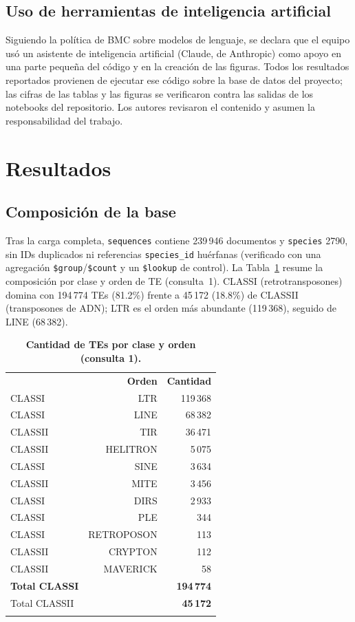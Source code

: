 \documentclass[pdflatex,sn-vancouver-num,lineno,referee]{sn-jnl}
\newcommand\cab[1]{{\color{white}\bfseries #1}}%
\newcommand\filasalternas{\rowcolors{2}{}{teClaro}}%
\begin{document}
\subsection{Uso de herramientas de inteligencia artificial}

Siguiendo la política de BMC sobre modelos de lenguaje, se declara que el
equipo usó un asistente de inteligencia artificial (Claude, de Anthropic)
como apoyo en una parte pequeña del código y en la creación de las figuras.
Todos los resultados reportados provienen de ejecutar ese código sobre la
base de datos del proyecto; las cifras de las tablas y las figuras se
verificaron contra las salidas de los notebooks del repositorio. Los autores
revisaron el contenido y asumen la responsabilidad del trabajo.

\section{Resultados}\label{sec:resultados}

\subsection{Composición de la base}

Tras la carga completa, \texttt{sequences} contiene 239\,946 documentos y
\texttt{species} 2790, sin IDs duplicados ni referencias
\texttt{species\_id} huérfanas (verificado con una agregación
\texttt{\$group}/\texttt{\$count} y un \texttt{\$lookup} de control). La
Tabla~\ref{tab:composicion} resume la composición por clase y orden de TE
(consulta~1). CLASSI (retrotransposones) domina con 194\,774 TEs (81.2\%)
frente a 45\,172 (18.8\%) de CLASSII (transposones de ADN); LTR es el orden
más abundante (119\,368), seguido de LINE (68\,382).

\begin{table}[!ht]
\caption{\textbf{Cantidad de TEs por clase y orden (consulta 1).}}
\filasalternas
\begin{tabular}{@{}lrr@{}}
\rowcolor{teOscuro}\cab{Clase} & \cab{Orden} & \cab{Cantidad} \\
CLASSI  & LTR        & 119\,368 \\
CLASSI  & LINE       & 68\,382 \\
CLASSII & TIR        & 36\,471 \\
CLASSII & HELITRON   & 5\,075 \\
CLASSI  & SINE       & 3\,634 \\
CLASSII & MITE       & 3\,456 \\
CLASSI  & DIRS       & 2\,933 \\
CLASSI  & PLE        & 344 \\
CLASSI  & RETROPOSON & 113 \\
CLASSII & CRYPTON    & 112 \\
CLASSII & MAVERICK   & 58 \\
\midrule
\textbf{Total CLASSI}  & & \textbf{194\,774} \\
Total CLASSII & & \textbf{45\,172} \\
\botrule
\end{tabular}
\label{tab:composicion}
\end{table}
\end{document}
